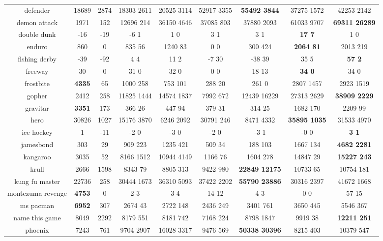 \documentclass{article}
\begin{document}
\begin{table}[!ht]
\begin{tabular}{|c|c|c|c|c|c|c|c|c|}
 defender & 18689 & 2874 & 18303  2611 & 20525  3114 & 52917  3355 & \bf{55492  3844} & 37275  1572 & 42253  2142 \\
 demon attack & 1971 & 152 & 12696  214 & 36150  4646 & 37085  803 & 37880  2093 & 61033  9707 & \bf{69311  26289} \\
 double dunk & -16 & -19 & -6  1 & 1  0 & 3  1 & 3  1 & \bf{17  7} & 1  0 \\
 enduro & 860 & 0 & 835  56 & 1240  83 & 0  0 & 300  424 & \bf{2064  81} & 2013  219 \\
 fishing derby & -39 & -92 & 4  4 & 11  2 & -7  30 & -38  39 & 35  5 & \bf{57  2} \\
 freeway & 30 & 0 & 31  0 & 32  0 & 0  0 & 18  13 & \bf{34  0} & 34  0 \\
 frostbite & \bf{4335} & 65 & 1000  258 & 753  101 & 288  20 & 261  0 & 2807  1457 & 2923  1519 \\
 gopher & 2412 & 258 & 11825  1444 & 14574  1837 & 7992  672 & 12439  16229 & 27313  2629 & \bf{38909  2229} \\
 gravitar & \bf{3351} & 173 & 366  26 & 447  94 & 379  31 & 314  25 & 1682  170 & 2209  99 \\
 hero & 30826 & 1027 & 15176  3870 & 6246  2092 & 30791  246 & 8471  4332 & \bf{35895  1035} & 31533  4970 \\
 ice hockey & 1 & -11 & -2  0 & -3  0 & -2  0 & -3  1 & -0  0 & \bf{3  1} \\
 jamesbond & 303 & 29 & 909  223 & 1235  421 & 509  34 & 188  103 & 1667  134 & \bf{4682  2281} \\
 kangaroo & 3035 & 52 & 8166  1512 & 10944  4149 & 1166  76 & 1604  278 & 14847  29 & \bf{15227  243} \\
 krull & 2666 & 1598 & 8343  79 & 8805  313 & 9422  980 & \bf{22849  12175} & 10733  65 & 10754  181 \\
 kung fu master & 22736 & 258 & 30444  1673 & 36310  5093 & 37422  2202 & \bf{55790  23886} & 30316  2397 & 41672  1668 \\
 montezuma revenge & \bf{4753} & 0 & 2  3 & 3  4 & 14  12 & 4  3 & 0  0 & 57  15 \\
 ms pacman & \bf{6952} & 307 & 2674  43 & 2722  148 & 2436  249 & 3401  761 & 3650  445 & 5546  367 \\
 name this game & 8049 & 2292 & 8179  551 & 8181  742 & 7168  224 & 8798  1847 & 9919  38 & \bf{12211  251} \\
 phoenix & 7243 & 761 & 9704  2907 & 16028  3317 & 9476  569 & \bf{50338  30396} & 8215  403 & 10379  547 \\

\end{tabular}
\end{table}
\end{document}
